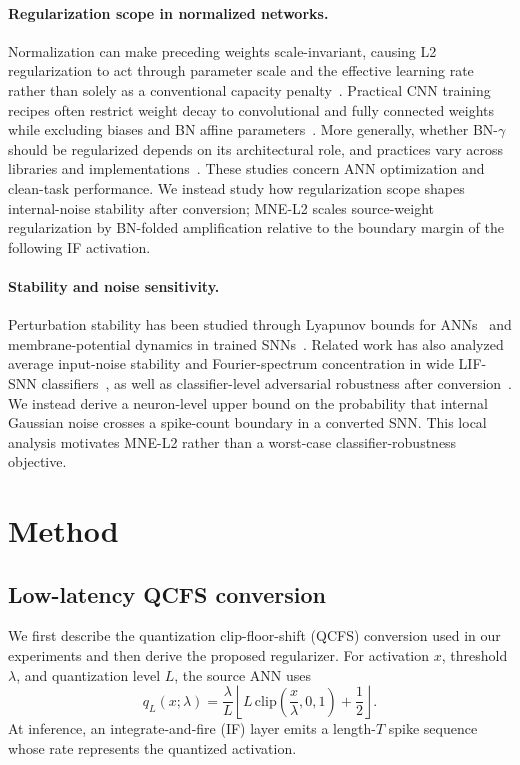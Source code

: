 \documentclass{article}
\begin{document}
\paragraph{Regularization scope in normalized networks.}
Normalization can make preceding weights scale-invariant, causing L2 regularization to act through parameter scale and the effective learning rate rather than solely as a conventional capacity penalty~\cite{van2017l2}. Practical CNN training recipes often restrict weight decay to convolutional and fully connected weights while excluding biases and BN affine parameters~\cite{he2019bag}. More generally, whether BN-$\gamma$ should be regularized depends on its architectural role, and practices vary across libraries and implementations~\cite{kim2024guidelines}. These studies concern ANN optimization and clean-task performance. We instead study how regularization scope shapes internal-noise stability after conversion; MNE-L2 scales source-weight regularization by BN-folded amplification relative to the boundary margin of the following IF activation.

\paragraph{Stability and noise sensitivity.}
Perturbation stability has been studied through Lyapunov bounds for ANNs~\cite{rahnama2020robust} and membrane-potential dynamics in trained SNNs~\cite{ding2024robust}. Related work has also analyzed average input-noise stability and Fourier-spectrum concentration in wide LIF-SNN classifiers~\cite{araya2026random}, as well as classifier-level adversarial robustness after conversion~\cite{ozdenizci2024adversarially}. We instead derive a neuron-level upper bound on the probability that internal Gaussian noise crosses a spike-count boundary in a converted SNN. This local analysis motivates MNE-L2 rather than a worst-case classifier-robustness objective.

\section{Method}

\subsection{Low-latency QCFS conversion}

We first describe the quantization clip-floor-shift (QCFS) conversion used in our experiments and then derive the proposed regularizer. For activation $x$, threshold $\lambda$, and quantization level $L$, the source ANN uses~\cite{bu2022optimal}
\begin{equation}
q_L(x;\lambda)=\frac{\lambda}{L}
\left\lfloor L\,\mathrm{clip}\!\left(\frac{x}{\lambda},0,1\right)+\frac{1}{2}\right\rfloor .
\label{eq:qcfs}
\end{equation}
At inference, an integrate-and-fire (IF) layer emits a length-$T$ spike sequence whose rate represents the quantized activation.
\end{document}

